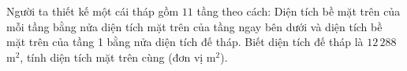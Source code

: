 \begin{bt}%
	Người ta thiết kế một cái tháp gồm $11$ tầng theo cách: Diện tích bề mặt trên của mỗi tầng bằng nửa diện tích mặt trên của tầng ngay bên dưới và diện tích bề mặt trên của tầng 1 bằng nửa diện tích đế tháp. Biết diện tích đế tháp là $12\,288$ m$^2$, tính diện tích mặt trên cùng (đơn vị m$^2$).
\end{bt}
